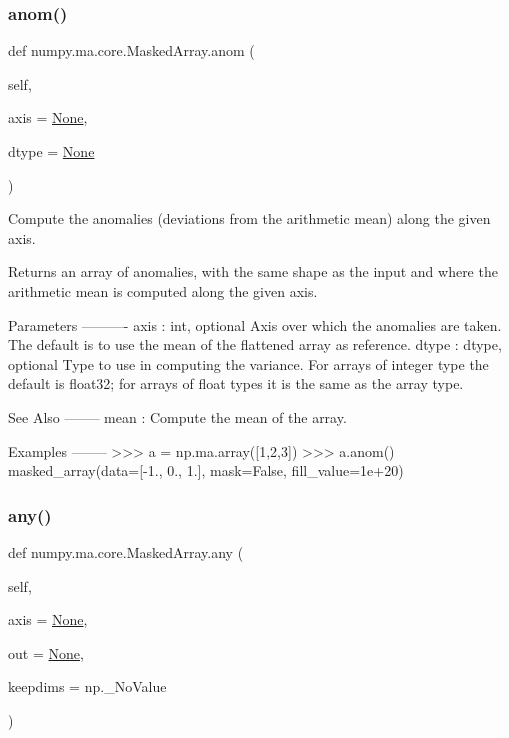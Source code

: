 \subsubsection{\texorpdfstring{anom()}{anom()}}
{\footnotesize\ttfamily def numpy.\+ma.\+core.\+Masked\+Array.\+anom (\begin{DoxyParamCaption}\item[{}]{self,  }\item[{}]{axis = {\ttfamily \hyperlink{namespacenumpy_1_1ma_1_1core_a647ee1848dfa3692fe35a663a2aa40b3}{None}},  }\item[{}]{dtype = {\ttfamily \hyperlink{namespacenumpy_1_1ma_1_1core_a647ee1848dfa3692fe35a663a2aa40b3}{None}} }\end{DoxyParamCaption})}

\begin{DoxyVerb}Compute the anomalies (deviations from the arithmetic mean)
along the given axis.

Returns an array of anomalies, with the same shape as the input and
where the arithmetic mean is computed along the given axis.

Parameters
----------
axis : int, optional
    Axis over which the anomalies are taken.
    The default is to use the mean of the flattened array as reference.
dtype : dtype, optional
    Type to use in computing the variance. For arrays of integer type
     the default is float32; for arrays of float types it is the same as
     the array type.

See Also
--------
mean : Compute the mean of the array.

Examples
--------
>>> a = np.ma.array([1,2,3])
>>> a.anom()
masked_array(data=[-1.,  0.,  1.],
     mask=False,
       fill_value=1e+20)\end{DoxyVerb}
 \mbox{\label{classnumpy_1_1ma_1_1core_1_1MaskedArray_a3243f2c272fd2cb57371f1f73dd27d5e}} 
\subsubsection{\texorpdfstring{any()}{any()}}
{\footnotesize\ttfamily def numpy.\+ma.\+core.\+Masked\+Array.\+any (\begin{DoxyParamCaption}\item[{}]{self,  }\item[{}]{axis = {\ttfamily \hyperlink{namespacenumpy_1_1ma_1_1core_a647ee1848dfa3692fe35a663a2aa40b3}{None}},  }\item[{}]{out = {\ttfamily \hyperlink{namespacenumpy_1_1ma_1_1core_a647ee1848dfa3692fe35a663a2aa40b3}{None}},  }\item[{}]{keepdims = {\ttfamily np.\+\_\+NoValue} }\end{DoxyParamCaption})}

